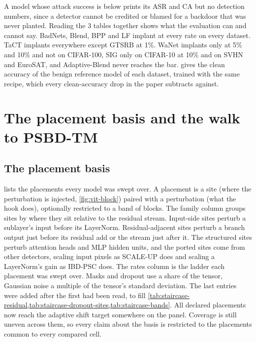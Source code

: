 A model whose attack success is below \AsrBar{} prints its ASR and CA but no detection numbers, since a detector cannot be credited or blamed for a backdoor that was never planted. Reading the 3 tables together shows what the evaluation can and cannot say. BadNets, Blend, BPP and LF implant at every rate on every dataset. TaCT implants everywhere except GTSRB at 1\%. WaNet implants only at 5\% and 10\% and not on CIFAR-100, SIG only on CIFAR-10 at 10\% and on SVHN and EuroSAT, and Adaptive-Blend never reaches the bar.  gives the clean accuracy of the benign reference model of each dataset, trained with the same recipe, which every clean-accuracy drop in the paper subtracts against.





\FloatBarrier

\FloatBarrier


\FloatBarrier
\clearpage

\section{The placement basis and the walk to PSBD-TM}
\label{app:placements}

\subsection{The placement basis}
\label{app:basis}

 lists the placements every model was swept over. A placement is a site (where the perturbation is injected, \cref{fig:vit-block}) paired with a perturbation (what the hook does), optionally restricted to a band of blocks. The family column groups sites by where they sit relative to the residual stream. Input-side sites perturb a sublayer's input before its LayerNorm. Residual-adjacent sites perturb a branch output just before its residual add or the stream just after it. The structured sites perturb attention heads and MLP hidden units, and the ported sites come from other detectors, scaling input pixels as SCALE-UP does and scaling a LayerNorm's gain as IBD-PSC does. The rates column is the ladder each placement was swept over. Masks and dropout use a share of the tensor, Gaussian noise a multiple of the tensor's standard deviation. The last entries were added after the first had been read, to fill \cref{tab:staircase-residual,tab:staircase-dropout-sites,tab:staircase-bands}. All \BasisSize{} declared placements now reach the adaptive shift target somewhere on the panel. Coverage is still uneven across them, so every claim about the basis is restricted to the placements common to every compared cell.

